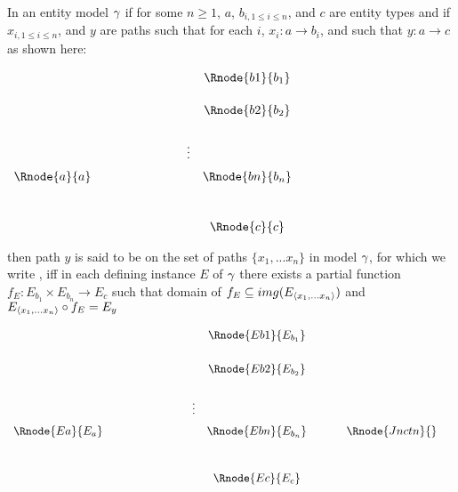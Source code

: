 \begin{definition} %
In an entity model $\gamma$  
if for some $n \geq 1$, $a$, $b_{i, 1 \leq i \leq n}$,  and $c$ are entity types and 
if  $x_{i, 1 \leq i \leq n}$, and $y$ are paths such
that for each $i$, $x_i : a \rightarrow b_i$, and such that $y: a \rightarrow c$ 
as shown here:
\setlength{\arraycolsep}{.2cm}
\begin{center}
$
\begin{array}{cp{2cm}cc}
             & &         & \Rnode{b1}{b_1} \\ [0.5cm]
						 & &         & \Rnode{b2}{b_2} \\ [0.6cm]
						 & & \vdots  &                 \\ [0.2cm]
\Rnode{a}{a} & &         & \Rnode{bn}{b_n} \\ [1.0cm]
             & &         & \Rnode{c}{c}   \\
\end{array}
$
\end{center}



\noindent 
then path $y$ is said to be  on the set of paths $\{x_1,...x_n\}$ in model $\gamma$, 
for which  we write  ,
iff
 in each defining instance $E$ of $\gamma$ there exists a  partial 
function $f_E: E_{b_1} \times E_{b_n} \rightarrow E_c$ 
\noindent such that 
domain of $f_E \subseteq img(E_{\langle x_1,... x_n \rangle})$ 
and  
$E_{\langle x_1,...x_n\rangle} \circ f_E = E_y$ 
\begin{center}
$
\begin{array}{cp{2cm}ccp{0.5cm}cc}
						    & &         & \Rnode{Eb1}{E_{b_1}}& &                            &        \\ [0.6cm]
						    & &         & \Rnode{Eb2}{E_{b_2}}& &                            &        \\ [0.6cm]
						    & &\vdots  &                      & &                            &        \\ [0.2cm]												
\Rnode{Ea}{E_a} & &         & \Rnode{Ebn}{E_{b_n}}& & \Rnode{Jnctn}{}&  \\ [1.0cm]
						    & &         & \Rnode{Ec}{{E_c}}   & &                            &        \\
\end{array}
$
\end{center}
\end{definition}

